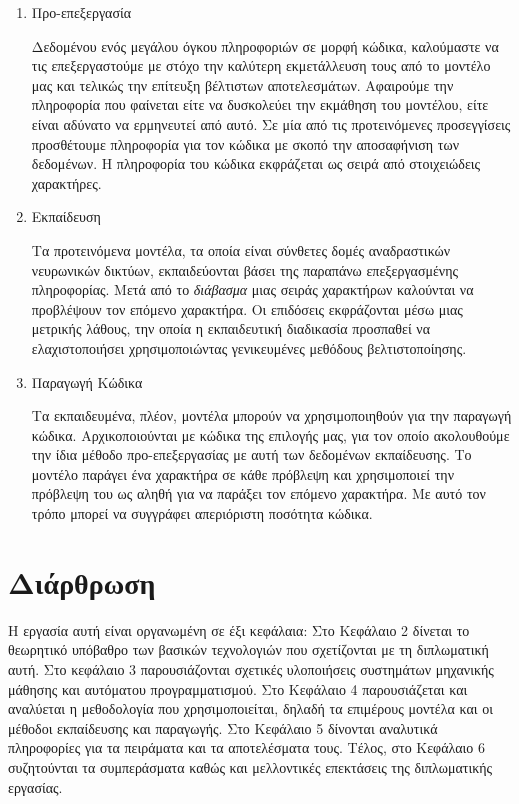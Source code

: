 \begin{enumerate}
\item Προ-επεξεργασία 

Δεδομένου ενός μεγάλου όγκου πληροφοριών σε μορφή κώδικα, καλούμαστε να τις επεξεργαστούμε με στόχο την καλύτερη εκμετάλλευση τους από το μοντέλο μας και τελικώς την επίτευξη βέλτιστων αποτελεσμάτων.
Αφαιρούμε την πληροφορία που φαίνεται είτε να δυσκολεύει την εκμάθηση του μοντέλου, είτε είναι αδύνατο να ερμηνευτεί από αυτό.
Σε μία από τις προτεινόμενες προσεγγίσεις προσθέτουμε πληροφορία για τον κώδικα με σκοπό την αποσαφήνιση των δεδομένων.
Η πληροφορία του κώδικα εκφράζεται ως σειρά από στοιχειώδεις χαρακτήρες.

\item Εκπαίδευση 

Τα προτεινόμενα μοντέλα, τα οποία είναι σύνθετες δομές αναδραστικών νευρωνικών δικτύων, εκπαιδεύονται βάσει της παραπάνω επεξεργασμένης πληροφορίας.
Μετά από το \textit{διάβασμα} μιας σειράς χαρακτήρων καλούνται να προβλέψουν τον επόμενο χαρακτήρα. Οι επιδόσεις εκφράζονται μέσω μιας μετρικής λάθους, την οποία η εκπαιδευτική διαδικασία προσπαθεί να ελαχιστοποιήσει χρησιμοποιώντας γενικευμένες μεθόδους βελτιστοποίησης.


\item Παραγωγή Κώδικα 

Τα εκπαιδευμένα, πλέον, μοντέλα μπορούν να χρησιμοποιηθούν για την παραγωγή κώδικα.
Αρχικοποιούνται με κώδικα της επιλογής μας, για τον οποίο ακολουθούμε την ίδια μέθοδο προ-επεξεργασίας με αυτή των δεδομένων εκπαίδευσης.
Το μοντέλο παράγει ένα χαρακτήρα σε κάθε πρόβλεψη και χρησιμοποιεί την πρόβλεψη του ως αληθή για να παράξει τον επόμενο χαρακτήρα.
Με αυτό τον τρόπο μπορεί να συγγράφει απεριόριστη ποσότητα κώδικα.
\end{enumerate}

\section{Διάρθρωση}
Η εργασία αυτή είναι οργανωμένη σε έξι κεφάλαια: Στο Κεφάλαιο 2 δίνεται το θεωρητικό υπόβαθρο των βασικών τεχνολογιών που σχετίζονται με τη διπλωματική αυτή.
Στο κεφάλαιο 3 παρουσιάζονται σχετικές υλοποιήσεις συστημάτων μηχανικής μάθησης και αυτόματου προγραμματισμού.
Στο Κεφάλαιο 4 παρουσιάζεται και αναλύεται η μεθοδολογία που χρησιμοποιείται, δηλαδή τα επιμέρους μοντέλα και οι μέθοδοι εκπαίδευσης και παραγωγής. Στο Κεφάλαιο 5 δίνονται αναλυτικά πληροφορίες για τα πειράματα και τα αποτελέσματα τους.
Τέλος, στο Κεφάλαιο 6 συζητούνται τα συμπεράσματα καθώς και μελλοντικές επεκτάσεις της διπλωματικής εργασίας.